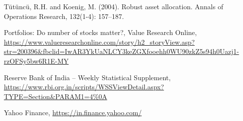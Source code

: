 \documentclass[12pt]{article}
\numberwithin{equation}{section}
\begin{document}
\begin{thebibliography}{plain}
 T{\"u}t{\"u}nc{\"u}, R.H. and Koenig, M. (2004).
Robust asset allocation.
Annals of Operations Research, 132(1-4): 157--187.

Portfolios: Do number of stocks matter?, Value Research Online,
{\url{https://www.valueresearchonline.com/story/h2_storyView.asp?str=200396&fbclid=IwAR3YkUaNLCY3keZGXfooehh0WU90zkZ5s94h0Uazj1-rzOFSy5bw6R1E-MY}}

Reserve Bank of India -- Weekly Statistical Supplement,
{\url{https://www.rbi.org.in/scripts/WSSViewDetail.aspx?TYPE=Section&PARAM1=4\%0A}}

Yahoo Finance,
{\url{https://in.finance.yahoo.com/}}

\end{thebibliography}

\newpage
\end{document}
